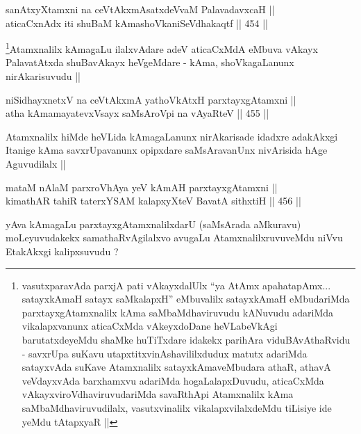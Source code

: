 \begin{shl}
sanAtxyXtamxni na ceVtAkxmAsatxdeVvaM PalavadavxcaH || \\
aticaCxnAdx iti shuBaM kAmashoVkaniSeVdhakaqtf ||  454 ||  
\end{shl}

\begin{artha}
\footnote{vasutxparavAda parxjA pati vAkayxdalUlx ``ya AtAmx
  apahatapAmx... satayxkAmaH satayx saMkalapxH'' eMbuvalilx
  satayxkAmaH eMbudariMda parxtayxgAtamxnalilx kAma saMbaMdhaviruvudu
kANuvudu adariMda vikalapxvanunx aticaCxMda vAkeyxdoDane heVLabeVkAgi
barutatxdeyeMdu shaMke huTiTxdare idakekx parihAra viduBAvAthaRvidu -
savxrUpa suKavu utapxtitxvinAshavililxdudux matutx adariMda satayxvAda
suKave Atamxnalilx satayxkAmaveMbudara athaR, athavA veVdayxvAda
barxhamxvu adariMda hogaLalapxDuvudu, aticaCxMda
vAkayxviroVdhaviruvudariMda savaRthApi Atamxnalilx kAma
saMbaMdhaviruvudilalx, vasutxvinalilx vikalapxvilalxdeMdu tiLisiye ide
yeMdu tAtapxyaR ||}Atamxnalilx kAmagaLu ilalxvAdare adeV aticaCxMdA eMbuva
vAkayx PalavatAtxda shuBavAkayx heVgeMdare - kAma, shoVkagaLanunx
nirAkarisuvudu ||
\end{artha}


\begin{shl}
niSidhayxnetxV na ceVtAkxmA yathoVkAtxH parxtayxgAtamxni || \\
atha kAmamayatevxV\s sayx saMsAroV\s pi na vAyaRteV ||  455 ||  
\end{shl}

\begin{artha}
Atamxnalilx hiMde heVLida kAmagaLanunx nirAkarisade idadxre
adakAkxgi Itanige kAma savxrUpavanunx opipxdare saMsAravanUnx
nivArisida hAge Aguvudilalx ||
\end{artha}


\begin{shl}
mataM nAlaM parxroVhAya yeV kAmAH parxtayxgAtamxni || \\
kimathAR tahiR taterxYSAM kalapxyXteV BavatA sithxtiH ||  456 ||  
\end{shl}

\begin{artha}
yAva kAmagaLu parxtayxgAtamxnalilxdarU (saMsArada aMkuravu)
moLeyuvudakekx samathaRvAgilalxvo avugaLu AtamxnalilxruvuveMdu niVvu
EtakAkxgi kalipxsuvudu ?
\end{artha}

